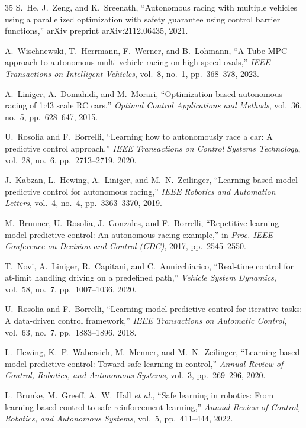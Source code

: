 \documentclass{iopjournal}
\begin{document}
\begin{thebibliography}{35}
S.~He, J.~Zeng, and K.~Sreenath,
``Autonomous racing with multiple vehicles using a parallelized optimization
with safety guarantee using control barrier functions,'' arXiv preprint
arXiv:2112.06435, 2021.

A.~Wischnewski, T.~Herrmann, F.~Werner, and B.~Lohmann,
``A Tube-MPC approach to autonomous multi-vehicle racing on high-speed ovals,''
\emph{IEEE Transactions on Intelligent Vehicles}, vol.~8, no.~1,
pp.~368--378, 2023.

A.~Liniger, A.~Domahidi, and M.~Morari,
``Optimization-based autonomous racing of 1:43 scale RC cars,''
\emph{Optimal Control Applications and Methods}, vol.~36, no.~5,
pp.~628--647, 2015.

U.~Rosolia and F.~Borrelli,
``Learning how to autonomously race a car: A predictive control approach,''
\emph{IEEE Transactions on Control Systems Technology}, vol.~28, no.~6,
pp.~2713--2719, 2020.

J.~Kabzan, L.~Hewing, A.~Liniger, and M.~N.~Zeilinger,
``Learning-based model predictive control for autonomous racing,''
\emph{IEEE Robotics and Automation Letters}, vol.~4, no.~4, pp.~3363--3370,
2019.

M.~Brunner, U.~Rosolia, J.~Gonzales, and F.~Borrelli,
``Repetitive learning model predictive control: An autonomous racing example,''
in \emph{Proc. IEEE Conference on Decision and Control (CDC)}, 2017,
pp.~2545--2550.

T.~Novi, A.~Liniger, R.~Capitani, and C.~Annicchiarico,
``Real-time control for at-limit handling driving on a predefined path,''
\emph{Vehicle System Dynamics}, vol.~58, no.~7, pp.~1007--1036, 2020.

U.~Rosolia and F.~Borrelli,
``Learning model predictive control for iterative tasks: A data-driven control
framework,'' \emph{IEEE Transactions on Automatic Control}, vol.~63, no.~7,
pp.~1883--1896, 2018.

L.~Hewing, K.~P.~Wabersich, M.~Menner, and M.~N.~Zeilinger,
``Learning-based model predictive control: Toward safe learning in control,''
\emph{Annual Review of Control, Robotics, and Autonomous Systems}, vol.~3,
pp.~269--296, 2020.

L.~Brunke, M.~Greeff, A.~W.~Hall \emph{et al.},
``Safe learning in robotics: From learning-based control to safe reinforcement
learning,'' \emph{Annual Review of Control, Robotics, and Autonomous Systems},
vol.~5, pp.~411--444, 2022.


\end{thebibliography}
\end{document}
